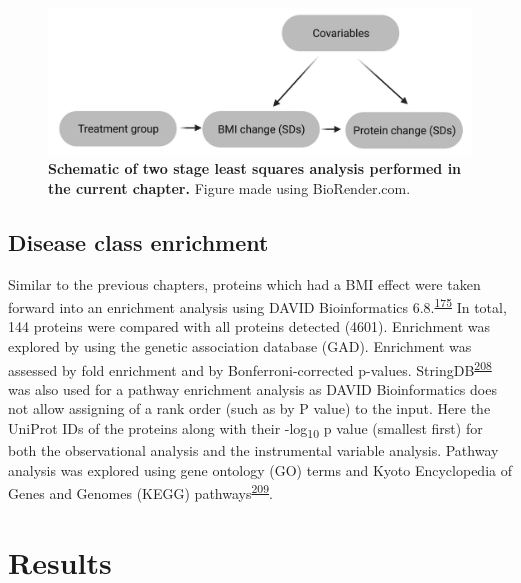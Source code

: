 \documentclass[11pt,twoside]{bristolthesis}
\begin{document}
\begin{figure}

{\centering \includegraphics{figure/DiRECT/DiRECT_analysis} 

}

\caption[Schematic of two stage least squares analysis performed using DiRECT data]{\textbf{Schematic of two stage least squares analysis performed in the current chapter.} Figure made using BioRender.com.}\label{fig:direct-tsls}
\end{figure}
\hypertarget{disease-class-enrichment}{%
\subsection{Disease class enrichment}\label{disease-class-enrichment}}

Similar to the previous chapters, proteins which had a BMI effect were taken forward into an enrichment analysis using DAVID Bioinformatics 6.8.\textsuperscript{\protect\hyperlink{ref-Huang2009}{175}} In total, 144 proteins were compared with all proteins detected (4601). Enrichment was explored by using the genetic association database (GAD). Enrichment was assessed by fold enrichment and by Bonferroni-corrected p-values. StringDB\textsuperscript{\protect\hyperlink{ref-Szklarczyk2021}{208}} was also used for a pathway enrichment analysis as DAVID Bioinformatics does not allow assigning of a rank order (such as by P value) to the input. Here the UniProt IDs of the proteins along with their -log\textsubscript{10} p value (smallest first) for both the observational analysis and the instrumental variable analysis. Pathway analysis was explored using gene ontology (GO) terms and Kyoto Encyclopedia of Genes and Genomes (KEGG) pathways\textsuperscript{\protect\hyperlink{ref-Kanehisa2016}{209}}.

\hypertarget{results-4}{%
\section{Results}\label{results-4}}
\end{document}
